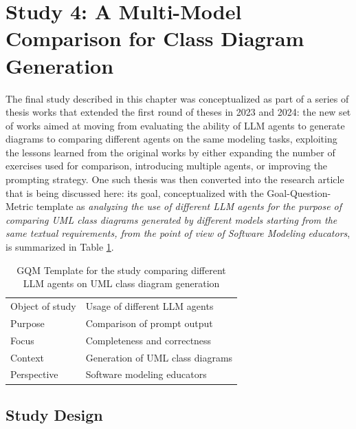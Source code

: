 \section{Study 4: A Multi-Model Comparison for Class Diagram Generation}

The final study described in this chapter was conceptualized as part of a series of thesis works that extended the first round of theses in 2023 and 2024: the new set of works aimed at moving from evaluating the ability of LLM agents to generate diagrams to comparing different agents on the same modeling tasks, exploiting the lessons learned from the original works by either expanding the number of exercises used for comparison, introducing multiple agents, or improving the prompting strategy. One such thesis was then converted into the research article that is being discussed here: its goal, conceptualized with the Goal-Question-Metric template as \textit{analyzing the use of different LLM agents for the purpose of comparing UML class diagrams generated by different models starting from the same textual requirements, from the point of view of Software Modeling educators}, is summarized in Table \ref{tab:llm4mod4_gqm}.

\begin{table}[ht]
    \centering
    \small
    \caption{GQM Template for the study comparing different LLM agents on UML class diagram generation}
    \begin{tabular}{@{}p{} p{}@{}}
    \toprule
        Object of study  & Usage of different LLM agents \\
        Purpose & Comparison of prompt output \\
        Focus & Completeness and correctness \\
        Context & Generation of UML class diagrams \\
        Perspective & Software modeling educators \\
        \bottomrule
    \end{tabular}
    \label{tab:llm4mod4_gqm}
\end{table}

\subsection{Study Design}

